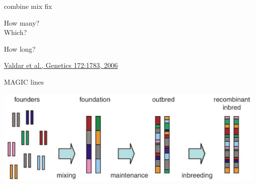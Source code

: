 \documentclass[12pt]{article}
\newcommand{\headsize}{\fontsize{35}{35} \selectfont}
\newcommand{\smallsize}{\fontsize{25}{30} \selectfont}
\newcommand{\smallersize}{\fontsize{20}{25} \selectfont}
\newcommand{\citesize}{\fontsize{14}{18} \selectfont}
\begin{document}
\smallsize \color{myyellow}
\hspace*{52mm} combine \hspace*{35mm} mix \hspace*{52mm} fix

\smallersize
\color{mywhite}
\vspace{20pt}

\hspace*{6mm}
\begin{minipage}[t]{45mm}
\vspace*{0mm}
\centering

How many? \\[20pt]
Which?
\end{minipage}
\hspace{57mm}
\begin{minipage}[t]{45mm}
\vspace*{0mm}
\centering

How long?
\end{minipage}
\hspace{18mm}
\begin{minipage}[t]{45mm}
\vspace*{0mm}
\centering


\end{minipage}


\vfill

\hfill {\citesize \color{citecolor} \href{http://www.genetics.org/content/172/3/1783.full}{Valdar et al., Genetics 172:1783, 2006}}

\vspace*{5mm}


\newpage

\addtocounter{page}{-1}

\headsize \color{myyellow}
\hfill \begin{minipage}{5.75in}
\centering
MAGIC lines
\end{minipage}

\vspace{20mm}

\centerline{\includegraphics[width=10in]{Figs/valdar_genet2006.png}}
\end{document}
